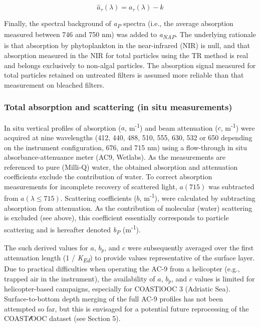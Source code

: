 \documentclass[essd, manuscript]{copernicus}
\begin{document}
\begin{equation}
    \hat{a}_\tau(\lambda) = a_\tau(\lambda) - k
\end{equation}

Finally, the spectral background of \textit{a\textsubscript{P}} spectra (i.e., the average absorption measured between 746 and 750 nm) was added to \textit{a\textsubscript{NAP}}. The underlying rationale is that absorption by phytoplankton in the near-infrared (NIR) is null, and that absorption measured in the NIR for total particles using the TR method is real \citep{Tassan2003} and belongs exclusively to non-algal particles. The absorption signal measured for total particles retained on untreated filters is assumed more reliable than that measurement on bleached filters.

\subsubsection{Total absorption and scattering (in situ measurements)}

In situ vertical profiles of absorption ($a$, m\textsuperscript{-1}) and beam attenuation ($c$, m\textsuperscript{-1}) were acquired at nine wavelengths (412, 440, 488, 510, 555, 630, 532 or 650 depending on the instrument configuration, 676, and 715 nm) using a flow-through in situ absorbance-attenuance meter (AC9, Wetlabs). As the measurements are referenced to pure (Milli-Q) water, the obtained absorption and attenuation coefficients exclude the contribution of water. To correct absorption measurements for incomplete recovery of scattered light, $a(715)$ was subtracted from $a(\lambda \le 715)$. Scattering coefficients ($b$, m\textsuperscript{-1}), were calculated by subtracting absorption from attenuation. As the contribution of molecular (water) scattering is excluded (see above), this coefficient essentially corresponds to particle scattering and is hereafter denoted \textit{b\textsubscript{P}} (m\textsuperscript{-1}).

The such derived values for $a$, $b_p$, and $c$ were subsequently averaged over the first attenuation length (1 / \textit{K\textsubscript{Ed}}) to provide values representative of the surface layer. Due to practical difficulties when operating the AC-9 from a helicopter (e.g., trapped air in the instrument), the availability of  $a$, $b_p$, and $c$ values is limited for helicopter-based campaigns, especially for COASTlOOC 3 (Adriatic Sea). Surface-to-bottom depth merging of the full AC-9 profiles has not been attempted so far, but this is envisaged for a potential future reprocessing of the COAST$\mathscr{l}$OOC dataset (see Section 5).
\end{document}

